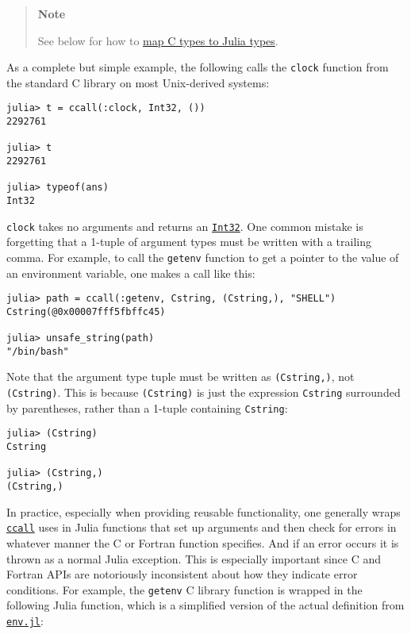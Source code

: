 \begin{quote}
\textbf{Note}

See below for how to \hyperlink{10872711251657367863}{map C types to Julia types}.

\end{quote}


As a complete but simple example, the following calls the \texttt{clock} function from the standard C library on most Unix-derived systems:




\begin{verbatim}
julia> t = ccall(:clock, Int32, ())
2292761

julia> t
2292761

julia> typeof(ans)
Int32
\end{verbatim}



\texttt{clock} takes no arguments and returns an \hyperlink{10103694114785108551}{\texttt{Int32}}. One common mistake is forgetting that a 1-tuple of argument types must be written with a trailing comma. For example, to call the \texttt{getenv} function to get a pointer to the value of an environment variable, one makes a call like this:




\begin{verbatim}
julia> path = ccall(:getenv, Cstring, (Cstring,), "SHELL")
Cstring(@0x00007fff5fbffc45)

julia> unsafe_string(path)
"/bin/bash"
\end{verbatim}



Note that the argument type tuple must be written as \texttt{(Cstring,)}, not \texttt{(Cstring)}. This is because \texttt{(Cstring)} is just the expression \texttt{Cstring} surrounded by parentheses, rather than a 1-tuple containing \texttt{Cstring}:




\begin{verbatim}
julia> (Cstring)
Cstring

julia> (Cstring,)
(Cstring,)
\end{verbatim}



In practice, especially when providing reusable functionality, one generally wraps \hyperlink{14245046751182637566}{\texttt{ccall}} uses in Julia functions that set up arguments and then check for errors in whatever manner the C or Fortran function specifies. And if an error occurs it is thrown as a normal Julia exception. This is especially important since C and Fortran APIs are notoriously inconsistent about how they indicate error conditions. For example, the \texttt{getenv} C library function is wrapped in the following Julia function, which is a simplified version of the actual definition from \href{https://github.com/JuliaLang/julia/blob/master/base/env.jl}{\texttt{env.jl}}:




